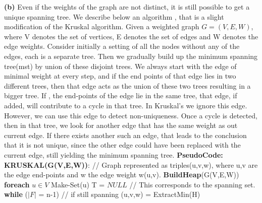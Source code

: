 \documentclass{article}
\renewcommand\part[1]{\vspace{.10in}\textbf{(#1)}}
\newcommand\pseudoCode{\vspace{.10in}\textbf{PseudoCode: }}
\begin{document}
  \part{b} Even if the weights of the graph are not distinct, it is still possible to get a unique spanning tree. We describe below an algorithm , that is a slight modification of the Kruskal algorithm. Given a weighted graph $G=(V,E,W)$, where V denotes the set of vertices, E denotes the set of edges and W denotes the edge weights. Consider initially a setting of all the nodes without any of the edges, each is a separate tree. Then we gradually build up the minimum spanning tree(mst) by union of these disjoint trees. We always start with the edge of minimal weight at every step, and if the end points of that edge lies in two different trees, then that edge acts as the union of these two trees resulting in a bigger tree. If , the end-points of the edge lie in the same tree, that edge, if added, will contribute to a cycle in that tree. In Kruskal's we ignore this edge. However, we can use this edge to detect non-uniqueness. Once a cycle is detected, then in that tree, we look for another edge that has the same weight as out current edge. If there exists another such an edge, that leads to the conclusion that it is not unique, since the other edge could have been replaced with the current edge, still yielding the minimum spanning tree. \newline
  \pseudoCode \newline
  \hspace*{0.0cm} \textbf {KRUSKAL(G(V,E,W))}: \newline
  \hspace*{0.5cm} //  Graph represented as triples(u,v,w), where u,v are the edge end-points and w the edge weight w(u,v). \newline
  \hspace*{0.5cm} \textbf {BuildHeap}(G(V,E,W)) \newline
  \hspace*{0.5cm} \textbf {foreach} $u \in V$ \newline
  \hspace*{1cm}     Make-Set(u) \newline
  \hspace*{0.5cm} T = $NULL$ // This corresponds to the spanning set. \newline
  \hspace*{0.5cm} \textbf {while} ($|F|$ = n-1) // if still spanning \newline
  \hspace*{1cm}		(u,v,w) = ExtractMin(H) \newline
\end{document}
